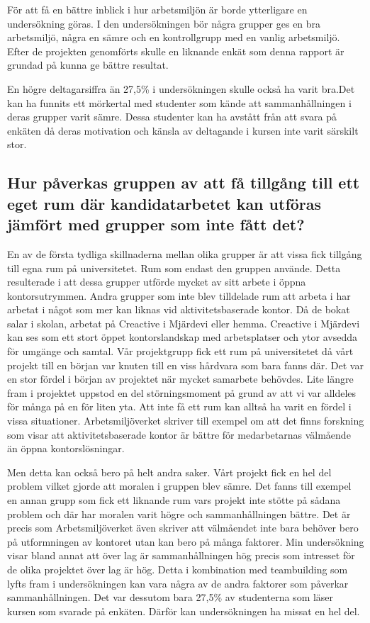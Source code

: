 För att få en bättre inblick i hur arbetsmiljön är borde ytterligare en undersökning göras. I den undersökningen bör några grupper ges en bra arbetsmiljö, några en sämre och en kontrollgrupp med en vanlig arbetsmiljö. Efter de projekten genomförts skulle en liknande enkät som denna rapport är grundad på kunna ge bättre resultat. 

En högre deltagarsiffra än 27,5\% i undersökningen skulle också ha varit bra.Det kan ha funnits ett mörkertal med studenter som kände att sammanhållningen i deras grupper varit sämre. Dessa studenter kan ha avstått från att svara på enkäten då deras motivation och känsla av deltagande i kursen inte varit särskilt stor.

\subsection{Hur påverkas gruppen av att få tillgång till ett eget rum där kandidatarbetet kan utföras jämfört med grupper som inte fått det?}
En av de första tydliga skillnaderna mellan olika grupper är att vissa fick tillgång till egna rum på universitetet. Rum som endast den gruppen använde. Detta resulterade i att dessa grupper utförde mycket av sitt arbete i öppna kontorsutrymmen. Andra grupper som inte blev tilldelade rum att arbeta i har arbetat i något som mer kan liknas vid aktivitetsbaserade kontor. Då de bokat salar i skolan, arbetat på Creactive i Mjärdevi eller hemma. Creactive i Mjärdevi kan ses som ett stort öppet kontorslandskap med arbetsplatser och ytor avsedda för umgänge och samtal. Vår projektgrupp fick ett rum på universitetet då vårt projekt till en början var knuten till en viss hårdvara som bara fanns där. Det var en stor fördel i början av projektet när mycket samarbete behövdes. Lite längre fram i projektet uppstod en del störningsmoment på grund av att vi var alldeles för många på en för liten yta. Att inte få ett rum kan alltså ha varit en fördel i vissa situationer. Arbetsmiljöverket skriver till exempel om att det finns forskning som visar att aktivitetsbaserade kontor är bättre för medarbetarnas välmående än öppna kontorslösningar. 

Men detta kan också bero på helt andra saker. Vårt projekt fick en hel del problem vilket gjorde att moralen i gruppen blev sämre. Det fanns till exempel en annan grupp som fick ett liknande rum vars projekt inte stötte på sådana problem och där har moralen varit högre och sammanhållningen bättre. Det är precis som Arbetsmiljöverket även skriver att välmåendet inte bara behöver bero på utformningen av kontoret utan kan bero på många faktorer. Min undersökning visar bland annat att över lag är sammanhållningen hög precis som intresset för de olika projektet över lag är hög. Detta i kombination med teambuilding som lyfts fram i undersökningen kan vara några av de andra faktorer som påverkar sammanhållningen. Det var dessutom bara 27,5\% av studenterna som läser kursen som svarade på enkäten. Därför kan undersökningen ha missat en hel del.

